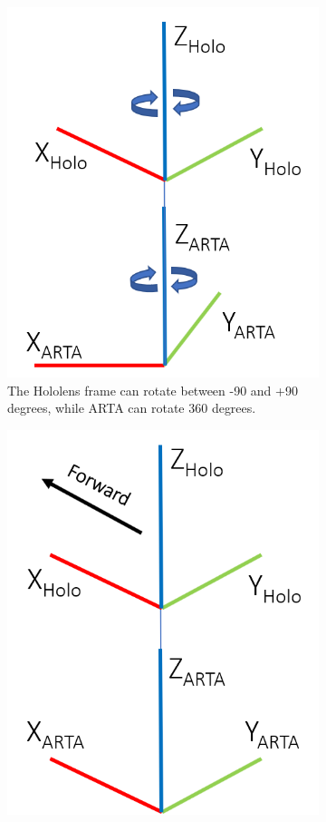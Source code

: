 \begin{figure}[ht]
	\begin{subfigure}[b]{.45\textwidth}
		\centering
		\includegraphics[width=0.75\linewidth]{img/chapter5_implementation/holoArtaFrames.png}
		\caption{The Hololens frame can rotate between -90 and +90 degrees, while ARTA can rotate 360 degrees.}
	\end{subfigure}%
	\hspace{\fill} 
	\begin{subfigure}[b]{.45\textwidth}
		\centering
		\includegraphics[width=0.75\linewidth]{img/chapter5_implementation/holoArtaFramesAligned.png}

\end{subfigure}
\end{figure}
